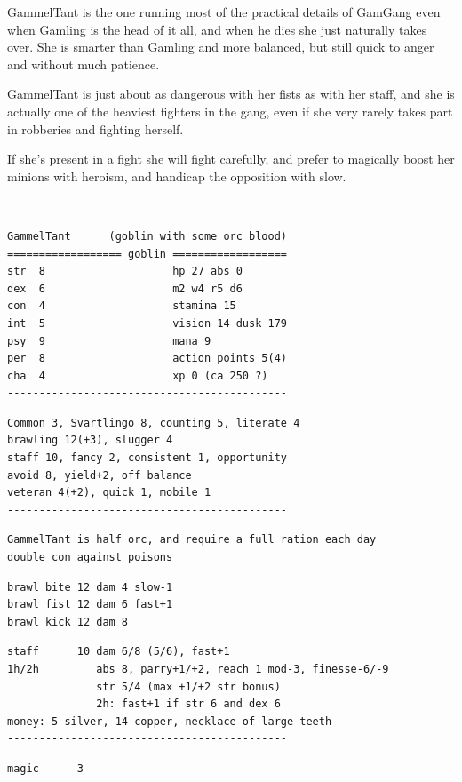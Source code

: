 GammelTant is the one running most of the practical details of GamGang even when Gamling is the head of it all, and when he dies she just naturally takes over. She is smarter than Gamling and more balanced, but still quick to anger and without much patience.

GammelTant is just about as dangerous with her fists as with her staff, and she is actually one of the heaviest fighters in the gang, even if she very rarely takes part in robberies and fighting herself.

If she's present in a fight she will fight carefully, and prefer to magically boost her minions with heroism, and handicap the opposition with slow.

\

\goodbreak \small \begin{samepage} \begin{verbatim}
GammelTant      (goblin with some orc blood)
================== goblin ==================
str  8                    hp 27 abs 0
dex  6                    m2 w4 r5 d6
con  4                    stamina 15
int  5                    vision 14 dusk 179
psy  9                    mana 9
per  8                    action points 5(4)
cha  4                    xp 0 (ca 250 ?)
--------------------------------------------
\end{verbatim} \goodbreak \begin{verbatim}
Common 3, Svartlingo 8, counting 5, literate 4
brawling 12(+3), slugger 4
staff 10, fancy 2, consistent 1, opportunity
avoid 8, yield+2, off balance     
veteran 4(+2), quick 1, mobile 1
--------------------------------------------
\end{verbatim} \goodbreak \begin{verbatim}
GammelTant is half orc, and require a full ration each day
double con against poisons
\end{verbatim} \goodbreak \begin{verbatim}
brawl bite 12 dam 4 slow-1
brawl fist 12 dam 6 fast+1
brawl kick 12 dam 8
\end{verbatim} \goodbreak \begin{verbatim}
staff      10 dam 6/8 (5/6), fast+1
1h/2h         abs 8, parry+1/+2, reach 1 mod-3, finesse-6/-9
              str 5/4 (max +1/+2 str bonus)
              2h: fast+1 if str 6 and dex 6
money: 5 silver, 14 copper, necklace of large teeth
--------------------------------------------
\end{verbatim} \goodbreak \begin{verbatim}
magic      3


\end{verbatim}
\end{samepage}

